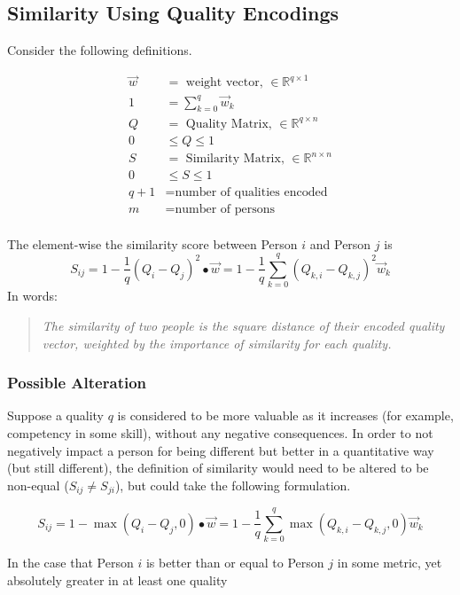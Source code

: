 \subsection{Similarity Using Quality Encodings}

Consider the following definitions.

\begin{align}
\vec{w} &= \text{ weight vector, } \in \mathbb{R}^{q \times 1} \\
1 &= \sum_{k=0}^{q} \vec{w}_k\\
Q &= \text{ Quality Matrix, } \in \mathbb{R}^{q \times n} \\
0 & \leq Q \leq 1 \\
S &= \text{ Similarity Matrix, } \in \mathbb{R}^{n \times n} \\
0 & \leq S \leq 1 \\
q + 1 &= \text{number of qualities encoded}\\
m &= \text{number of persons}\\
\end{align}

The element-wise the similarity score between Person $i$ and Person $j$ is
\[S_{ij} = 1- \frac{1}{q}(Q_i - Q_j)^2\bullet \vec{w} =  1 - \frac{1}{q}\sum_{k=0}^{q} (Q_{k,i} - Q_{k,j})^2\vec{w}_k\]
In words:
\begin{quote}
\textit{The similarity of two people is the square distance of their encoded quality vector, weighted by the importance of similarity for each quality.}
\end{quote}

\subsubsection{Possible Alteration}

Suppose a quality $q$ is considered to be more valuable as it increases (for example, competency in some skill), without any negative consequences. In order to not negatively impact a person for being different but better in a quantitative way (but still different), the definition of similarity would need to be altered to be non-equal ($S_{ij} \neq S_{ji}$), but could take the following formulation.

\[S_{ij} = 1- \max(Q_i - Q_j, 0) \bullet \vec{w} =  1 - \frac{1}{q}\sum_{k=0}^{q} \max(Q_{k,i} - Q_{k,j}, 0)\vec{w}_k\]

In the case that Person $i$ is better than or equal to Person $j$ in some metric, yet absolutely greater in at least one quality

